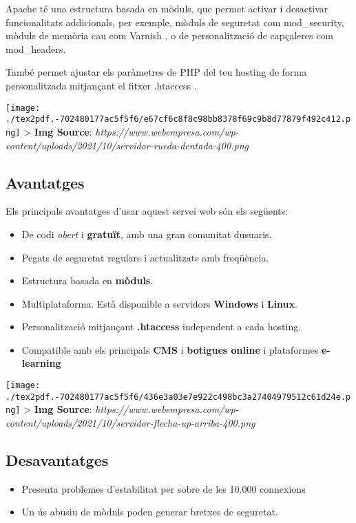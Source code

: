 \documentclass[]{article}
\begin{document}
Apache té una estructura basada en mòduls, que permet activar i
desactivar funcionalitats addicionals, per exemple, mòduls de seguretat
com mod\_security, mòduls de memòria cau com Varnish , o de
personalització de capçaleres com mod\_headers.

També permet ajustar els paràmetres de PHP del teu hosting de forma
personalitzada mitjançant el fitxer .htaccess .

\texttt{[image: ./tex2pdf.-702480177ac5f5f6/e67cf6c8f8c98bb8378f69c9b8d77879f492c412.png]}
\textgreater{} \textbf{Img Source}:
\emph{https://www.webempresa.com/wp-content/uploads/2021/10/servidor-rueda-dentada-400.png}

\hypertarget{avantatges}{%
\subsection{\texorpdfstring{\textbf{Avantatges}}{Avantatges}}\label{avantatges}}

Els principals avantatges d'usar aquest servei web són els següents:

\begin{itemize}
\item
  De codi \emph{obert} i \textbf{gratuït}, amb una gran comunitat
  dusuaris.
\item
  Pegats de seguretat regulars i actualitzats amb freqüència.
\item
  Estructura basada en \textbf{mòduls}.
\item
  Multiplataforma. Està disponible a servidors \textbf{Windows} i
  \textbf{Linux}.
\item
  Personalització mitjançant \textbf{.htaccess} independent a cada
  hosting.
\item
  Compatible amb els principals \textbf{CMS} i \textbf{botigues online}
  i plataformes \textbf{e-learning}
\end{itemize}

\texttt{[image: ./tex2pdf.-702480177ac5f5f6/436e3a03e7e922c498bc3a27404979512c61d24e.png]}
\textgreater{} \textbf{Img Source}:
\emph{https://www.webempresa.com/wp-content/uploads/2021/10/servidor-flecha-up-arriba-400.png}

\hypertarget{desavantatges}{%
\subsection{\texorpdfstring{\textbf{Desavantatges}}{Desavantatges}}\label{desavantatges}}

\begin{itemize}
\item
  Presenta problemes d'estabilitat per sobre de les 10.000 connexions
\item
  Un ús abusiu de mòduls poden generar bretxes de seguretat.
\end{itemize}
\end{document}
